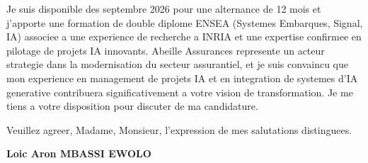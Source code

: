 \documentclass[a4paper,11pt]{article}
\begin{document}
Je suis disponible des septembre 2026 pour une alternance de 12 mois et j'apporte une formation de double diplome ENSEA (Systemes Embarques, Signal, IA) associee a une experience de recherche a INRIA et une expertise confirmee en pilotage de projets IA innovants. Abeille Assurances represente un acteur strategie dans la modernisation du secteur assurantiel, et je suis convaincu que mon experience en management de projets IA et en integration de systemes d'IA generative contribuera significativement a votre vision de transformation. Je me tiens a votre disposition pour discuter de ma candidature.

\vspace{1.5em}
\noindent Veuillez agreer, Madame, Monsieur, l'expression de mes salutations distinguees.

\vspace{2em}
\noindent \textbf{Loic Aron MBASSI EWOLO}
\end{document}
